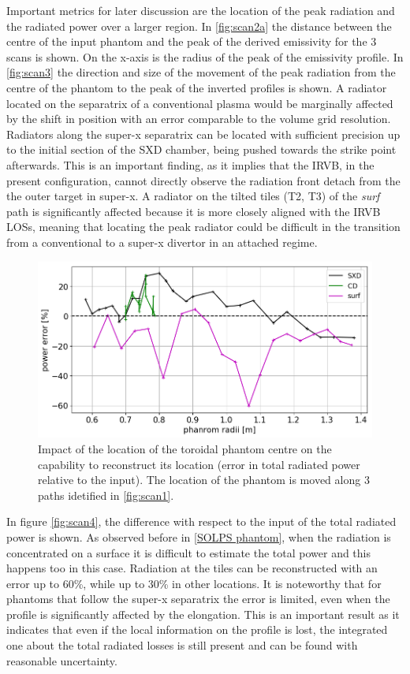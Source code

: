 Important metrics for later discussion are the location of the peak radiation and the radiated power over a larger region.
In \autoref{fig:scan2a} the distance between the centre of the input phantom and the peak of the derived emissivity for the 3 scans is shown. On the x-axis is the radius of the peak of the emissivity profile. In \autoref{fig:scan3} the direction and size of the movement of the peak radiation from the centre of the phantom to the peak of the inverted profiles is shown. A radiator located on the separatrix of a conventional plasma would be marginally affected by the shift in position with an error comparable to the volume grid resolution. Radiators along the super-x separatrix can be located with sufficient precision up to the initial section of the SXD chamber, being pushed towards the strike point afterwards. This is an important finding, as it implies that the IRVB, in the present configuration, cannot directly observe the radiation front detach from the the outer target in super-x. A radiator on the tilted tiles (T2, T3) of the \emph{surf} path is significantly affected because it is more closely aligned with the IRVB LOSs, meaning that locating the peak radiator could be difficult in the transition from a conventional to a super-x divertor in an attached regime.


\begin{figure}[!ht]
         \centering
         \includegraphics[trim={0 0 0 0},clip,width=0.7\linewidth]{Chapters/chapter2/figs/power_error.png}
    \caption{Impact of the location of the toroidal phantom centre on the capability to reconstruct its location (error in total radiated power relative to the input). The location of the phantom is moved along 3 paths idetified in \autoref{fig:scan1}.}
    \label{fig:scan4}
\end{figure}

In figure \autoref{fig:scan4}, the difference with respect to the input of the total radiated power is shown. As observed before in \autoref{SOLPS phantom}, when the radiation is concentrated on a surface it is difficult to estimate the total power and this happens too in this case. Radiation at the tiles can be reconstructed with an error up to 60\%, while up to 30\% in other locations. It is noteworthy that for phantoms that follow the super-x separatrix the error is limited, even when the profile is significantly affected by the elongation. This is an important result as it indicates that even if the local information on the profile is lost, the integrated one about the total radiated losses is still present and can be found with reasonable uncertainty.


